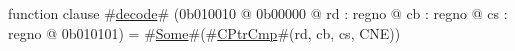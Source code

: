 function clause #\hyperref[zdecode]{decode}# (0b010010 @ 0b00000 @ rd : regno @ cb : regno @ cs : regno @ 0b010101) = #\hyperref[zSome]{Some}#(#\hyperref[zCPtrCmp]{CPtrCmp}#(rd, cb, cs, CNE))
